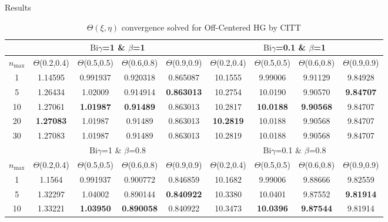 \documentclass[english,landscape,xcolor=dvipsnames,aspectratio=169]{beamer}
\newcommand{\Bi}{\mathrm{Bi}}
\newcommand{\nmax}{n_{\max}}
\begin{document}
\begin{frame}{Results}
\tiny
\begin{table}[h!]
	\caption{$\Theta(\xi,\eta)$ convergence solved for Off-Centered HG by CITT}\vspace{-.7em} %
	\centering
	\setlength\tabcolsep{1.5pt}
	\renewcommand\arraystretch{1}
	\begin{tabular}{|c|c|c|c|c|c|c|c|c|}%
		\hline
		&\multicolumn{4}{|c|}{$\Bi\gamma$=1 \& $\beta$=1}& \multicolumn{4}{c|}{$\Bi\gamma$=0.1 \& $\beta$=1} \\ \hline
		$\nmax$ & $\Theta$(0.2,0.4)& $\Theta$(0.5,0.5)&  $\Theta$(0.6,0.8)& $\Theta$(0.9,0.9) & $\Theta$(0.2,0.4)& $\Theta$(0.5,0.5)&  $\Theta$(0.6,0.8)& $\Theta$(0.9,0.9) \\\hline
		1 & 1.14595 & 0.991937 & 0.920318 & 0.865087  & 10.1555 & 9.99006 & 9.91129 & 9.84928 \\
		5 & 1.26434 & 1.02009 & 0.914914 &  \bfseries 0.863013 & 10.2754 & 10.0190 & 9.90570 &  \bfseries 9.84707  \\
		10 & 1.27061 &  \bfseries 1.01987 &  \bfseries 0.91489 & 0.863013 & 10.2817 &  \bfseries 10.0188 &  \bfseries 9.90568 & 9.84707 \\
		20 &  \bfseries 1.27083 & 1.01987 & 0.91489 & 0.863013 &  \bfseries 10.2819 & 10.0188 & 9.90568 & 9.84707 \\
		30 & 1.27083 & 1.01987 & 0.91489 & 0.863013 & 10.2819 & 10.0188 & 9.90568 & 9.84707 \\
		\hline
		&\multicolumn{4}{|c|}{$\Bi\gamma$=1 \& $\beta$=0.8} & \multicolumn{4}{c|}{$\Bi\gamma$=0.1 \& $\beta$=0.8} \\ \hline
		$\nmax$ & $\Theta$(0.2,0.4)& $\Theta$(0.5,0.5)&  $\Theta$(0.6,0.8)& $\Theta$(0.9,0.9) & $\Theta$(0.2,0.4)& $\Theta$(0.5,0.5)&  $\Theta$(0.6,0.8)& $\Theta$(0.9,0.9)\\ \hline
		1 &  1.1564 & 0.991937 & 0.900772 & 0.846859 & 10.1682 & 9.99006 & 9.88666 & 9.82559 \\
		5 & 1.32297 & 1.04002 & 0.890144 & \bfseries  0.840922 & 10.3380 & 10.0401 & 9.87552 &  \bfseries 9.81914 \\
		10 & 1.33221 &  \bfseries 1.03950 &  \bfseries 0.890058 & 0.840922 & 10.3473 &  \bfseries 10.0396 &  \bfseries 9.87544 & 9.81914 \\

\end{tabular}
\end{table}
\end{frame}
\end{document}
